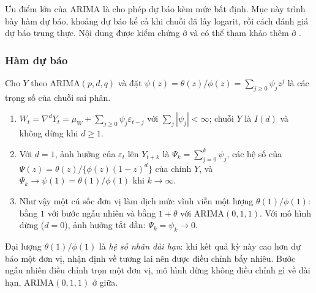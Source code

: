 Ưu điểm lớn của ARIMA là cho phép dự báo kèm mức bất định. Mục này trình bày hàm dự báo, khoảng dự báo kể cả khi chuỗi đã lấy logarit, rồi cách đánh giá dự báo trung thực. Nội dung được kiểm chứng ở  và có thể tham khảo thêm ở .

\subsubsection{Hàm dự báo}

Cho $Y$ theo ARIMA$(p,d,q)$ và đặt $\psi(z)=\theta(z)/\phi(z)=\sum_{j\ge0}\psi_jz^j$ là các trọng số của chuỗi sai phân.
\begin{kq}
\begin{enumerate}[label=(\roman*),leftmargin=*,itemsep=1pt]
\item $W_t=\nabla^dY_t=\mu_W+\sum_{j\ge0}\psi_j\varepsilon_{t-j}$ với $\sum_j|\psi_j|<\infty$; chuỗi $Y$ là $I(d)$ và không dừng khi $d\ge1$.
\item Với $d=1$, ảnh hưởng của $\varepsilon_t$ lên $Y_{t+k}$ là $\Psi_k=\sum_{j=0}^{k}\psi_j$, các hệ số của $\Psi(z)=\theta(z)/\{\phi(z)(1-z)^d\}$ của chính $Y$, và $\Psi_k\to\psi(1)=\theta(1)/\phi(1)$ khi $k\to\infty$.
\item Như vậy một cú sốc đơn vị làm dịch mức vĩnh viễn một lượng $\theta(1)/\phi(1)$: bằng $1$ với bước ngẫu nhiên và bằng $1+\theta$ với ARIMA$(0,1,1)$. Với mô hình dừng ($d=0$), ảnh hưởng tắt dần: $\Psi_k=\psi_k\to0$.
\end{enumerate}
\end{kq}
Đại lượng $\theta(1)/\phi(1)$ là \emph{hệ số nhân dài hạn}: khi kết quả kỳ này cao hơn dự báo một đơn vị, nhận định về tương lai nên được điều chỉnh bấy nhiêu. Bước ngẫu nhiên điều chỉnh trọn một đơn vị, mô hình dừng không điều chỉnh gì về dài hạn, ARIMA$(0,1,1)$ ở giữa.

